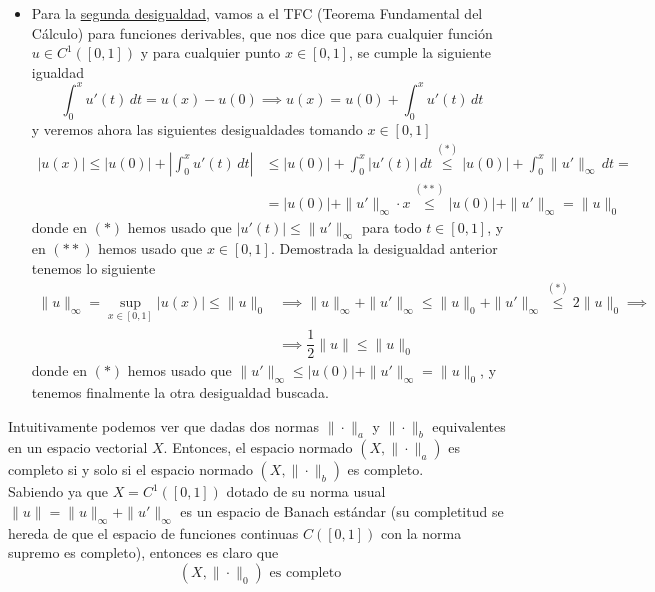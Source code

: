 \begin{ejercicio}
\begin{description}
\begin{itemize}
            \item Para la \underline{segunda desigualdad}, vamos a el TFC (Teorema Fundamental del Cálculo) para funciones derivables, que nos dice que para cualquier función $u \in C^1([0,1])$ y para cualquier punto $x \in [0,1]$, se cumple la siguiente igualdad
            $$\int_{0}^{x} u'(t) \, dt=u(x)-u(0)\implies u(x)=u(0)+\int_{0}^{x} u'(t) \, dt$$
            y veremos ahora las siguientes desigualdades tomando $x\in[0,1]$
            \begin{align*}
                |u(x)| \le |u(0)| + \left| \int_{0}^{x} u'(t) \, dt \right| &\le |u(0)| + \int_{0}^{x} |u'(t)| \, dt \overset{(*)}{\leq} |u(0)| + \int_{0}^{x} \|u'\|_\infty \, dt = \\ 
                &=|u(0)| + \|u'\|_\infty \cdot x \overset{(**)}{\leq} |u(0)| + \|u'\|_\infty=\|u\|_0
            \end{align*}
            donde en $(*)$ hemos usado que $|u'(t)| \le \|u'\|_\infty$ para todo $t \in [0,1]$, y en $(**)$ hemos usado que $x\in [0,1]$. Demostrada la desigualdad anterior tenemos lo siguiente
            \begin{align*}
                \|u\|_\infty = \sup_{x \in [0,1]} |u(x)| \le \|u\|_0 &\implies \|u\|_\infty + \|u'\|_\infty \le \|u\|_0 + \|u'\|_\infty\overset{(*)}{\leq} 2 \|u\|_0 \implies \\
                &\implies \dfrac{1}{2}\|u\| \le \|u\|_0
            \end{align*}
            donde en $(*)$ hemos usado que $\|u'\|_\infty \le |u(0)| + \|u'\|_\infty = \|u\|_0$, y tenemos finalmente la otra desigualdad buscada.
        \end{itemize}
        \item[$(i)$] Intuitivamente podemos ver que dadas dos normas $\|\cdot\|_a$ y $\|\cdot\|_b$ equivalentes en un espacio vectorial $X$. Entonces, el espacio normado $(X, \|\cdot\|_a)$ es completo si y solo si el espacio normado $(X, \|\cdot\|_b)$ es completo. \\
        
        \noindent
        Sabiendo ya que $X = C^1([0,1])$ dotado de su norma usual $\|u\| = \|u\|_\infty + \|u'\|_\infty$ es un espacio de Banach estándar (su completitud se hereda de que el espacio de funciones continuas $C([0,1])$ con la norma supremo es completo), entonces es claro que 
        \begin{equation*}
            (X, \|\cdot\|_0) \text{ es completo}
        \end{equation*}
    \end{description}
\end{ejercicio}


